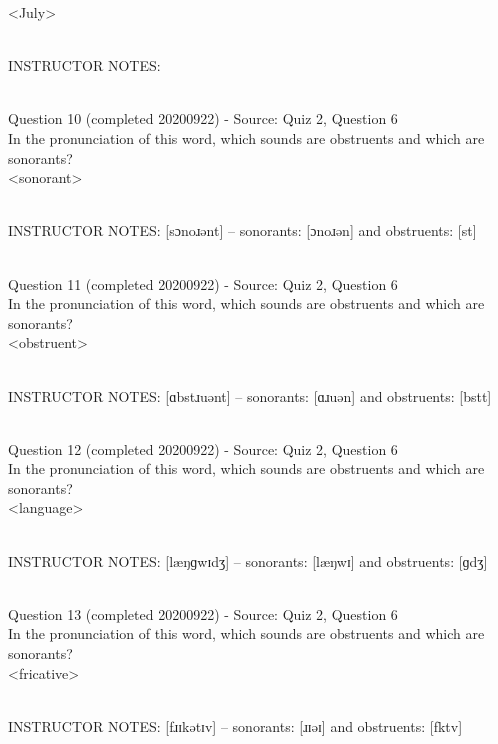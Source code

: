\documentclass[12pt]{article}
\begin{document}
<July>


~\\
INSTRUCTOR NOTES: 


~\\

{\large Question 10} (completed 20200922) - Source: Quiz 2, Question 6\\

In the pronunciation of this word, which sounds are obstruents and which are sonorants?\\

<sonorant>


~\\
INSTRUCTOR NOTES: [sɔnoɹənt] -- sonorants: [ɔnoɹən] and obstruents: [st]


~\\

{\large Question 11} (completed 20200922) - Source: Quiz 2, Question 6\\

In the pronunciation of this word, which sounds are obstruents and which are sonorants?\\

<obstruent>


~\\
INSTRUCTOR NOTES: [ɑbstɹuənt] -- sonorants: [ɑɹuən] and obstruents: [bstt]


~\\

{\large Question 12} (completed 20200922) - Source: Quiz 2, Question 6\\

In the pronunciation of this word, which sounds are obstruents and which are sonorants?\\

<language>


~\\
INSTRUCTOR NOTES: [læŋɡwɪdʒ] -- sonorants: [læŋwɪ] and obstruents: [ɡdʒ]


~\\

{\large Question 13} (completed 20200922) - Source: Quiz 2, Question 6\\

In the pronunciation of this word, which sounds are obstruents and which are sonorants?\\

<fricative>


~\\
INSTRUCTOR NOTES: [fɹɪkətɪv] -- sonorants: [ɹɪəɪ] and obstruents: [fktv]
\end{document}
